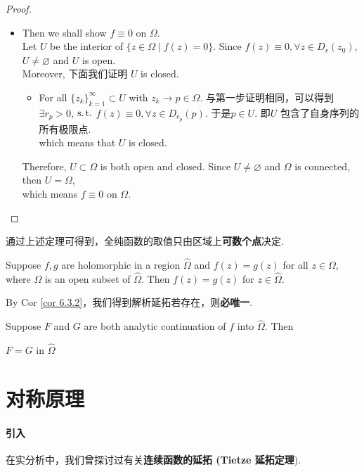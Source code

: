 \begin{thm}
\begin{proof}
\begin{itemize}
			\item Then we shall show $f \equiv 0$ on $\Omega$. \\
			Let $U$ be the interior of $\{ z \in \Omega \mid f(z) = 0 \}$. Since $f(z) \equiv 0 , \forall z \in D_{r}(z_0)$, $U \neq \varnothing$ and $U$ is open. \\
			Moreover, 下面我们证明 $U$ is closed.
			\begin{itemize}
				\item For all $\{ z_k \}_{k = 1}^{\infty} \subset U$ with $z_k \to p \in \Omega$. 与第一步证明相同，可以得到\\
				$\exists r_p > 0$, $\operatorname{s.t.}$ $f(z) \equiv 0 , \forall z \in D_{r_p}(p)$. 于是$p \in U$. 即$U$ 包含了自身序列的所有极限点. \\
				which means that $U$ is closed.
			\end{itemize}
			Therefore, $U \subset \Omega$ is both open and closed. Since $U \neq \varnothing$ and $\Omega$ is connected, then $U = \Omega$, \\
			which means $f \equiv 0$ on $\Omega$.
		\end{itemize}
	\end{proof}
\end{thm}

\vspace{2em}
通过上述定理可得到，全纯函数的取值只由区域上\textbf{可数个点}决定.
\begin{corollary}\label{cor 6.3.2}
	Suppose $f , g$ are holomorphic in a region $\hat{\Omega}$ and $f(z) = g(z)$ for all $z \in \Omega$, where $\Omega$ is an open subset of $\hat{\Omega}$. Then $f(z) = g(z)$ for $z \in \hat{\Omega}$.
\end{corollary}

\vspace{2em}
By Cor \ref{cor 6.3.2}，我们得到解析延拓若存在，则\textbf{必唯一}.
\begin{corollary}\label{cor 3.3.3}
	Suppose $F$ and $G$ are both analytic continuation of $f$ into $\hat{\Omega}$. Then
	\begin{center}
		$F = G$ in $\hat{\Omega}$
	\end{center}
\end{corollary}

\newpage

\section{对称原理}
\paragraph{引入}
在实分析中，我们曾探讨过有关\textbf{连续函数的延拓 (Tietze 延拓定理}). 

